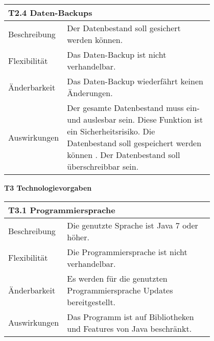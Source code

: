 {%
\centering
\begin{tabular}{|l|p{0.8\linewidth}|}
\hline
\multicolumn{2}{|l|}{\textbf{T2.4 Daten-Backups}}
  \tabularnewline \hline
Beschreibung                                               &  Der Datenbestand soll gesichert werden können.                                                \tabularnewline \hline
Flexibilität                                              & Das Daten-Backup ist nicht verhandelbar.                                                                                \tabularnewline \hline
Änderbarkeit                                         & Das Daten-Backup wiederfährt keinen Änderungen.                                                        \tabularnewline \hline
Auswirkungen                                                & Der gesamte Datenbestand muss ein- und auslesbar sein. Diese Funktion ist ein Sicherheitsrisiko. Die Datenbestand soll gespeichert werden können . Der Datenbestand soll überschreibbar sein.                               \tabularnewline \hline
 \hline
\end{tabular}
\newpage
\begin{flushleft}
\textbf{T3  Technologievorgaben}
\end{flushleft}
\centering
\begin{tabular}{|l|p{0.8\linewidth}|}
\hline
\multicolumn{2}{|l|}{\textbf{T3.1 Programmiersprache}}
  \tabularnewline \hline
Beschreibung                                               &  Die genutzte Sprache ist Java 7 oder höher.                                                \tabularnewline \hline
Flexibilität                                              & Die Programmiersprache ist nicht verhandelbar.                                                                                \tabularnewline \hline
Änderbarkeit                                         & Es werden für die genutzten Programmiersprache  Updates bereitgestellt.                                                        \tabularnewline \hline
Auswirkungen                                                & Das Programm ist auf Bibliotheken und Features von Java beschränkt.                                \tabularnewline \hline
 \hline
\end{tabular}

}
